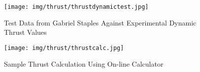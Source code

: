 \documentclass[../main.tex]{subfiles}
\begin{document}
\begin{figure}[H]
	\centering
	\texttt{[image: img/thrust/thrustdynamictest.jpg]}
	\caption{Test Data from Gabriel Staples Against Experimental Dynamic Thrust Values \cite{thrusteq}}
	\label{fig:thrustdynamictest}
\end{figure}

\begin{figure}[H]
	\centering
	\texttt{[image: img/thrust/thrustcalc.jpg]}
	\caption{Sample Thrust Calculation Using On-line Calculator \cite{thrustcalc}}
	\label{fig:thrustcalc}
\end{figure}

\pagebreak
\end{document}
